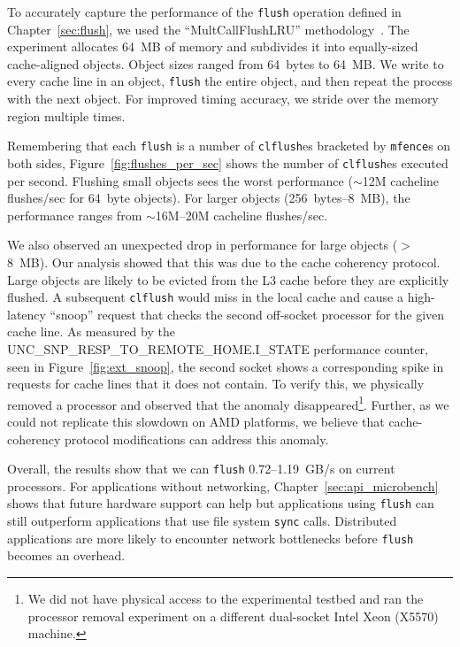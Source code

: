 To accurately capture the performance of the \texttt{flush} operation
defined in Chapter~\ref{sec:flush}, we used the ``MultCallFlushLRU''
methodology~\citep{Whaley08}.  The experiment allocates 64~MB of
memory and subdivides it into equally-sized cache-aligned objects.
Object sizes ranged from 64~bytes to 64~MB\@.  We write to every
cache line in an object, \texttt{flush} the entire object, and then
repeat the process with the next object.  For improved timing
accuracy, we stride over the memory region multiple times.

Remembering that each \texttt{flush} is a number of \texttt{clflush}es
bracketed by \texttt{mfence}s on both sides,
Figure~\ref{fig:flushes_per_sec} shows the number of
\texttt{clflush}es executed per second.  Flushing small objects sees
the worst performance ($\sim$12M cacheline flushes/sec for 64~byte
objects).  For larger objects (256~bytes--8~MB), the performance
ranges from $\sim$16M--20M cacheline flushes/sec.

\begin{sloppypar}
We also observed an unexpected drop in performance for large objects
($>$8~MB).  Our analysis showed that this was due to the cache
coherency protocol.  Large objects are likely to be evicted from the
L3 cache before they are explicitly flushed. A subsequent
\texttt{clflush} would miss in the local cache and cause a
high-latency ``snoop'' request that checks the second off-socket
processor for the given cache line.  As measured by the
UNC\_SNP\_RESP\_TO\_REMOTE\_HOME.I\_STATE performance counter, seen in
Figure~\ref{fig:ext_snoop}, the second socket shows a corresponding
spike in requests for cache lines that it does not contain.  To verify
this, we physically removed a processor and observed that the anomaly
disappeared\footnote{We did not have physical access to the
  experimental testbed and ran the processor removal experiment on a different
  dual-socket Intel Xeon (X5570) machine.}.  Further, as we could not
replicate this slowdown on AMD platforms, we believe that
cache-coherency protocol modifications can address this anomaly.
\end{sloppypar}


Overall, the results show that we can \texttt{flush} 0.72--1.19~GB/s
on current processors.  For applications without networking,
Chapter~\ref{sec:api_microbench} shows that future hardware support
can help but applications using \texttt{flush} can still outperform
applications that use file system \texttt{sync} calls.  Distributed
applications are more likely to encounter network bottlenecks before
\texttt{flush} becomes an overhead.

